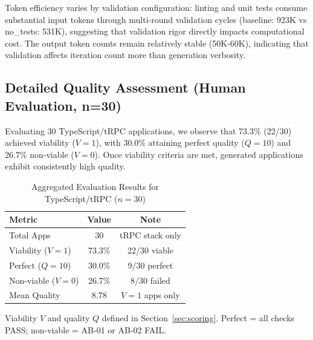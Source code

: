\documentclass[conference]{IEEEtran}
\begin{document}
Token efficiency varies by validation configuration: linting and unit tests consume substantial input tokens through multi-round validation cycles (baseline: 923K vs no\_tests: 531K), suggesting that validation rigor directly impacts computational cost. The output token counts remain relatively stable (50K-60K), indicating that validation affects iteration count more than generation verbosity.

\subsection{Detailed Quality Assessment (Human Evaluation, n=30)}

Evaluating 30 TypeScript/tRPC applications, we observe that 73.3\% (22/30) achieved viability ($V=1$), with 30.0\% attaining perfect quality ($Q=10$) and 26.7\% non-viable ($V=0$). Once viability criteria are met, generated applications exhibit consistently high quality.

\begin{table}[!t]
\caption{Aggregated Evaluation Results for TypeScript/tRPC ($n=30$)}
\label{tab:aggregated-results}
\centering
\small
\begin{threeparttable}
\begin{tabular}{@{}lcc@{}}
\toprule
\textbf{Metric} & \textbf{Value} & \textbf{Note} \\
\midrule
Total Apps & 30 & tRPC stack only \\
Viability ($V=1$) & 73.3\% & 22/30 viable \\
Perfect ($Q=10$) & 30.0\% & 9/30 perfect \\
Non-viable ($V=0$) & 26.7\% & 8/30 failed \\
Mean Quality & 8.78 & $V=1$ apps only \\
\bottomrule
\end{tabular}
\begin{tablenotes}\footnotesize
\item Viability $V$ and quality $Q$ defined in Section~\ref{sec:scoring}. Perfect = all checks PASS; non-viable = AB-01 or AB-02 FAIL.
\end{tablenotes}
\end{threeparttable}
\end{table}
\end{document}
